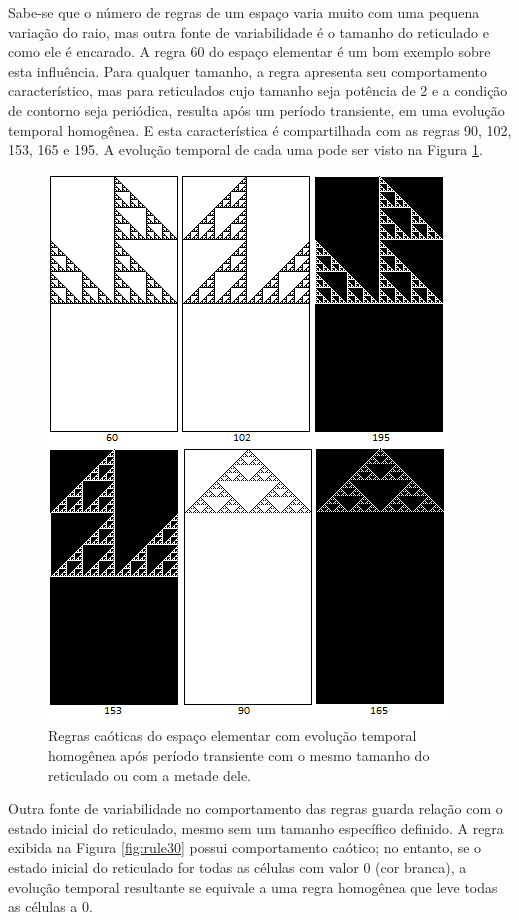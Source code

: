 \documentclass[12pt,a4paper]{report}
\begin{document}
	Sabe-se que o número de regras de um espaço varia muito com uma pequena variação do raio, mas outra fonte de variabilidade é o tamanho do reticulado e como ele é encarado. A regra 60 do espaço elementar é um bom exemplo sobre esta influência. Para qualquer tamanho, a regra apresenta seu comportamento característico, mas para reticulados cujo tamanho seja potência de 2 e a condição de contorno seja periódica, resulta após um período transiente, em uma evolução temporal homogênea. E esta característica é compartilhada com as regras 90, 102, 153, 165 e 195. A evolução temporal de cada uma pode ser visto na Figura \ref{fig:rulesHomoPow2}.
	
	\begin{figure}[H]
		\centering
		\includegraphics[scale=1]{./img/rules_homogeneous_pow2.png}
		\caption{Regras caóticas do espaço elementar com evolução temporal homogênea após período transiente com o mesmo tamanho do reticulado ou com a metade dele.}
		\label{fig:rulesHomoPow2}
	\end{figure}
	
	Outra fonte de variabilidade no comportamento das regras guarda relação com o estado inicial do reticulado, mesmo sem um tamanho específico definido. A regra exibida na Figura \ref{fig:rule30} possui comportamento caótico; no entanto, se o estado inicial do reticulado for todas as células com valor 0 (cor branca), a evolução temporal resultante se equivale a uma regra homogênea que leve todas as células a 0.
	
\end{document}

